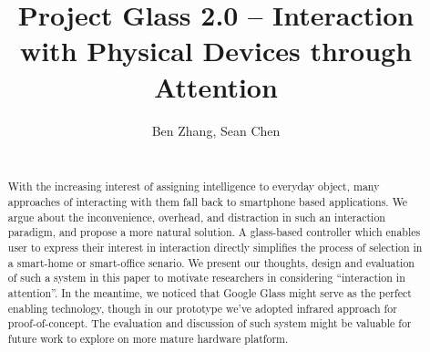 \documentclass{sig-alternate}
\begin{document}


\setlength{\paperheight}{11in}
\setlength{\paperwidth}{8.5in}
\setlength{\pdfpageheight}{\paperheight}
\setlength{\pdfpagewidth}{\paperwidth}

\title{Project Glass 2.0 -- Interaction with Physical Devices through Attention}

\author{
{Ben Zhang, Sean Chen}\\
\\
}

\maketitle

\begin{abstract}
With the increasing interest of assigning intelligence to everyday object, many approaches of interacting with them fall back to smartphone based applications. We argue about the inconvenience, overhead, and distraction in such an interaction paradigm, and propose a more natural solution. A glass-based controller which enables user to express their interest in interaction directly simplifies the process of selection in a smart-home or smart-office senario. We present our thoughts, design and evaluation of such a system in this paper to motivate researchers in considering ``interaction in attention''. In the meantime, we noticed that Google Glass might serve as the perfect enabling technology, though in our prototype we've adopted infrared approach for proof-of-concept. The evaluation and discussion of such system might be valuable for future work to explore on more mature hardware platform.
\end{abstract}















\end{document}
